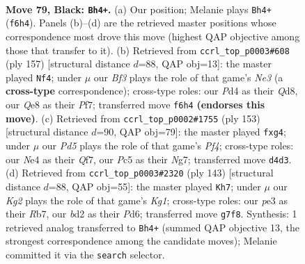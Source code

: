 \documentclass[11pt]{article}
\begin{document}
\clearpage

\begin{figure}[p]\centering
\begin{subfigure}{0.46\textwidth}\centering
\resizebox{\linewidth}{!}{%
\newchessgame
\chessboard[
  setfen={1r2q3/6k1/5b2/P1p2p2/2QpnPp1/4P3/R2B4/3NK3 b - - 2 79},
  showmover=false,
  pgfstyle=straightmove, color=movearrow, markmove={f6-h4}
]}
\caption{}
\end{subfigure}\hfill
\begin{subfigure}{0.46\textwidth}\centering
\resizebox{\linewidth}{!}{%
\newchessgame
\chessboard[
  setfen={3q3k/5p2/2p1np2/2b1pN1P/Pp2P1P1/3B2K1/2P5/1Q6 b - - 3 79},
  showmover=false,
  pgfstyle=straightmove, color=movearrow, markmove={e6-f4}
]}
\caption{}
\end{subfigure}
\\[4pt]
\begin{subfigure}{0.46\textwidth}\centering
\resizebox{\linewidth}{!}{%
\newchessgame
\chessboard[
  setfen={8/5qnk/1pb4p/2p1Qp2/2P2PPP/8/5B2/5BK1 b - - 0 77},
  showmover=false,
  pgfstyle=straightmove, color=movearrow, markmove={f5-g4}
]}
\caption{}
\end{subfigure}\hfill
\begin{subfigure}{0.46\textwidth}\centering
\resizebox{\linewidth}{!}{%
\newchessgame
\chessboard[
  setfen={q5k1/Pr2pp2/3p2p1/3P2Pn/2BQ3p/5P1P/R6K/8 b - - 12 72},
  showmover=false,
  pgfstyle=straightmove, color=movearrow, markmove={g8-h7}
]}
\caption{}
\end{subfigure}
\caption{\textbf{Move 79, Black: \texttt{Bh4+}.} (a) Our position; Melanie plays \texttt{Bh4+} (\texttt{f6h4}). Panels (b)--(d) are the retrieved master positions whose correspondence most drove this move (highest QAP objective among those that transfer to it). (b) Retrieved from \texttt{ccrl\_top\_p0003\#608} (ply 157) [structural distance $d$=88, QAP obj=13]: the master played \texttt{Nf4}; under $\mu$ our \emph{Bf3} plays the role of that game's \emph{Ne3} (a \textbf{cross-type} correspondence); cross-type roles: our \emph{P}d4 as their \emph{Q}d8, our \emph{Q}e8 as their \emph{P}f7; transferred move \texttt{f6h4} \textbf{(endorses this move)}. (c) Retrieved from \texttt{ccrl\_top\_p0002\#1755} (ply 153) [structural distance $d$=90, QAP obj=79]: the master played \texttt{fxg4}; under $\mu$ our \emph{Pd5} plays the role of that game's \emph{Pf4}; cross-type roles: our \emph{N}e4 as their \emph{Q}f7, our \emph{P}c5 as their \emph{N}g7; transferred move \texttt{d4d3}. (d) Retrieved from \texttt{ccrl\_top\_p0003\#2320} (ply 143) [structural distance $d$=88, QAP obj=55]: the master played \texttt{Kh7}; under $\mu$ our \emph{Kg2} plays the role of that game's \emph{Kg1}; cross-type roles: our \emph{p}e3 as their \emph{R}b7, our \emph{b}d2 as their \emph{P}d6; transferred move \texttt{g7f8}. Synthesis: 1 retrieved analog transferred to \texttt{Bh4+} (summed QAP objective 13, the strongest correspondence among the candidate moves); Melanie committed it via the \texttt{search} selector.}
\label{fig:thought-m157}
\end{figure}
\end{document}
